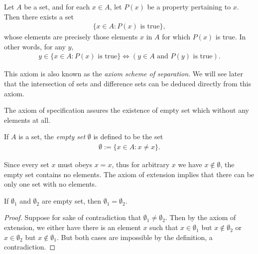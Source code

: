 \begin{axiom}
    Let $A$ be a set, and for each $x \in A$, let $P(x)$ be a property pertaining to $x$. Then there exists a set 
    \begin{align*}
        \{x \in A : P(x) \text{ is true}\},
    \end{align*}
    whose elements are precisely those elements $x$ in $A$ for which $P(x)$ is true. In other words, for any $y$,
        \begin{align*}
            y \in \{x \in A : P(x) \text{ is true}\}
            \Longleftrightarrow 
            (y \in A \text{ and } P(y) \text{ is true}).
        \end{align*}
\end{axiom}

\begin{remark}
    This axiom is also known as the \emph{axiom scheme of separation}. We will see later that the intersection of sets and difference sets can be deduced directly from this axiom.
\end{remark}


The axiom of specification assures the existence of empty set which without any elements at all.

\begin{definition}
    If $A$ is a set, the \emph{empty set} $\emptyset$ is defined to be the set
    \begin{align*}
        \emptyset := \{x \in A : x \neq x\}.
    \end{align*}
\end{definition}

Since every set $x$ must obeys $x = x$, thus for arbitrary $x$ we have $x \notin \emptyset$, the empty set contains no elements. The axiom of extension implies that there can be only one set with no elements.

\begin{lemma}
    If $\emptyset_1$ and $\emptyset_2$ are empty set, then $\emptyset_1 = \emptyset_2$.
\end{lemma}

\begin{proof}
    Suppose for sake of contradiction that $\emptyset_1 \neq \emptyset_2$. Then by the axiom of extension, we either have there is an element $x$ such that $x \in \emptyset_1$ but $x \notin \emptyset_2$ or $x \in \emptyset_2$ but $x \notin \emptyset_1$. But both cases are impossible by the definition, a contradiction.
\end{proof}

